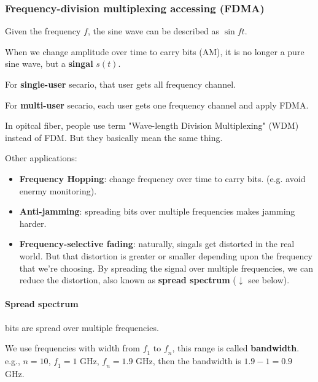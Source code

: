 \documentclass{../../ainote}
\begin{document}
\subsubsection{Frequency-division multiplexing accessing (FDMA)}
Given the frequency $\mathit{f}$, the sine wave can be described as $\sin \mathit{f}t$.

When we change amplitude over time to carry bits (AM), it is no longer a pure sine wave, but a \textbf{singal} $s(t)$.

For \textbf{single-user} secario, that user gets all frequency channel.

For \textbf{multi-user} secario, each user gets one frequency channel and apply FDMA.

\begin{supp}
    In opitcal fiber, people use term "Wave-length Division Multiplexing" (WDM) instead of FDM. But they basically mean the same thing.
\end{supp}

Other applications:
\begin{itemize}
    \item \textbf{Frequency Hopping}: change frequency over time to carry bits. (e.g. avoid enermy monitoring).
    \item \textbf{Anti-jamming}: spreading bits over multiple frequencies makes jamming harder.
    \item \textbf{Frequency-selective fading}: naturally, singals get distorted in the real world. But that distortion is greater or smaller depending upon the frequency that we're choosing. By spreading the signal over multiple frequencies, we can reduce the distortion, also known as \textbf{spread spectrum} ($\downarrow$ see below).
\end{itemize}

\paragraph{Spread spectrum} bits are spread over multiple frequencies. 

We use frequencies with width from $\mathit{f}_1$ to $\mathit{f}_n$, this range is called \textbf{bandwidth}. e.g., $n=10$, $\mathit{f}_1=1$ GHz, $\mathit{f}_n=1.9$ GHz, then the bandwidth is $1.9-1=0.9$ GHz.
\end{document}
